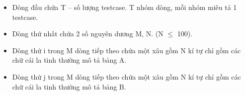 \begin{itemize}
	\item Dòng đầu chứa T – số lượng testcase. T nhóm dòng, mỗi nhóm miêu tả 1 testcase.
	\item Dòng thứ nhất chứa 2 số nguyên dương M, N. (N  $\le$  100).
	\item Dòng thứ i trong M dòng tiếp theo chứa một xâu gồm N kí tự chỉ gồm các chữ cái la tinh thường mô tả bảng A.
	\item Dòng thứ j trong M dòng tiếp theo chứa một xâu gồm N kí tự chỉ gồm các chữ cái la tinh thường mô tả bảng B.
\end{itemize}

\